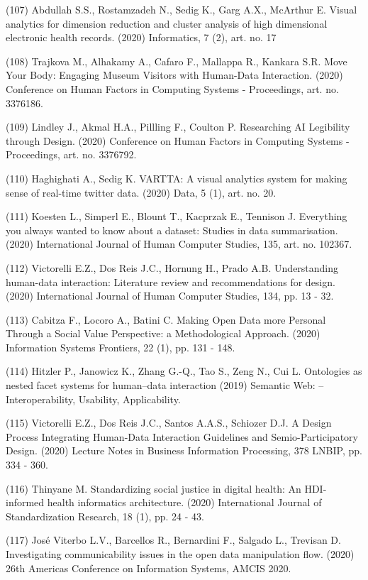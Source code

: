 \documentclass[
	12pt,				%
	oneside,			%
	a4paper,			%
	english,			%
	brazil				%
	]{abntex2ppgsi}
\begin{document}
\begin{apendicesenv}
(107) Abdullah S.S., Rostamzadeh N., Sedig K., Garg A.X., McArthur E. Visual analytics for dimension reduction and cluster analysis of high dimensional electronic health records. (2020) Informatics, 7 (2), art. no. 17

(108) Trajkova M., Alhakamy A., Cafaro F., Mallappa R., Kankara S.R. Move Your Body: Engaging Museum Visitors with Human-Data Interaction. (2020) Conference on Human Factors in Computing Systems - Proceedings, art. no. 3376186.

(109) Lindley J., Akmal H.A., Pillling F., Coulton P. Researching AI Legibility through Design. (2020) Conference on Human Factors in Computing Systems - Proceedings, art. no. 3376792.

(110) Haghighati A., Sedig K. VARTTA: A visual analytics system for making sense of real-time twitter data. (2020) Data, 5 (1), art. no. 20.

(111) Koesten L., Simperl E., Blount T., Kacprzak E., Tennison J. Everything you always wanted to know about a dataset: Studies in data summarisation.(2020) International Journal of Human Computer Studies, 135, art. no. 102367.

(112) Victorelli E.Z., Dos Reis J.C., Hornung H., Prado A.B. Understanding human-data interaction: Literature review and recommendations for design. (2020) International Journal of Human Computer Studies, 134, pp. 13 - 32.

(113) Cabitza F., Locoro A., Batini C. Making Open Data more Personal Through a Social Value Perspective: a Methodological Approach. (2020) Information Systems Frontiers, 22 (1), pp. 131 - 148.

(114) Hitzler P., Janowicz K., Zhang G.-Q., Tao S., Zeng N., Cui L. Ontologies as nested facet systems for human–data interaction (2019) Semantic Web: – Interoperability, Usability, Applicability.

(115) Victorelli E.Z., Dos Reis J.C., Santos A.A.S., Schiozer D.J. A Design Process Integrating Human-Data Interaction Guidelines and Semio-Participatory Design. (2020) Lecture Notes in Business Information Processing, 378 LNBIP, pp. 334 - 360.

(116) Thinyane M. Standardizing social justice in digital health: An HDI-informed health informatics architecture. (2020) International Journal of Standardization Research, 18 (1), pp. 24 - 43.

(117) José Viterbo L.V., Barcellos R., Bernardini F., Salgado L., Trevisan D. Investigating communicability issues in the open data manipulation flow. (2020) 26th Americas Conference on Information Systems, AMCIS 2020.


\end{apendicesenv}
\end{document}
